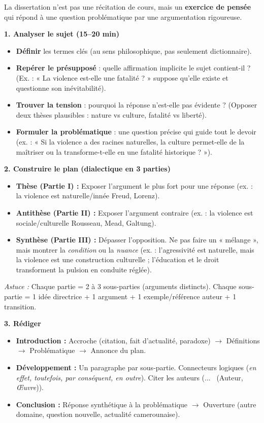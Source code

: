 \documentclass[11pt]{article}
\begin{document}
\begin{methode}
La dissertation n'est pas une récitation de cours, mais un \textbf{exercice de pensée} qui répond à une question problématique par une argumentation rigoureuse.

\textbf{1. Analyser le sujet (15--20 min)}
\begin{itemize}
\item \textbf{Définir} les termes clés (au sens philosophique, pas seulement dictionnaire).
\item \textbf{Repérer le présupposé} : quelle affirmation implicite le sujet contient-il ? (Ex. : « La violence est-elle une fatalité ? » suppose qu'elle existe et questionne son inévitabilité).
\item \textbf{Trouver la tension} : pourquoi la réponse n'est-elle pas évidente ? (Opposer deux thèses plausibles : nature vs culture, fatalité vs liberté).
\item \textbf{Formuler la problématique} : une question précise qui guide tout le devoir (ex. : « Si la violence a des racines naturelles, la culture permet-elle de la maîtriser ou la transforme-t-elle en une fatalité historique ? »).
\end{itemize}

\textbf{2. Construire le plan (dialectique en 3 parties)}
\begin{itemize}
\item \textbf{Thèse (Partie I) :} Exposer l'argument le plus fort pour une réponse (ex. : la violence est naturelle/innée \rightarrow Freud, Lorenz).
\item \textbf{Antithèse (Partie II) :} Exposer l'argument contraire (ex. : la violence est sociale/culturelle \rightarrow Rousseau, Mead, Galtung).
\item \textbf{Synthèse (Partie III) :} Dépasser l'opposition. Ne pas faire un « mélange », mais montrer la \emph{condition} ou la \emph{nuance} (ex. : l'agressivité est naturelle, mais la violence est une construction culturelle ; l'éducation et le droit transforment la pulsion en conduite réglée).
\end{itemize}
\textit{Astuce :} Chaque partie = 2 à 3 sous-parties (arguments distincts). Chaque sous-partie = 1 idée directrice + 1 argument + 1 exemple/référence auteur + 1 transition.

\textbf{3. Rédiger}
\begin{itemize}
\item \textbf{Introduction :} Accroche (citation, fait d'actualité, paradoxe) $\rightarrow$ Définitions $\rightarrow$ Problématique $\rightarrow$ Annonce du plan.
\item \textbf{Développement :} Un paragraphe par sous-partie. Connecteurs logiques (\emph{en effet, toutefois, par conséquent, en outre}). Citer les auteurs (\guillemotleft ... \guillemotright\ (Auteur, \emph{Œuvre})).
\item \textbf{Conclusion :} Réponse synthétique à la problématique $\rightarrow$ Ouverture (autre domaine, question nouvelle, actualité camerounaise).
\end{itemize}
\end{methode}
\end{document}
